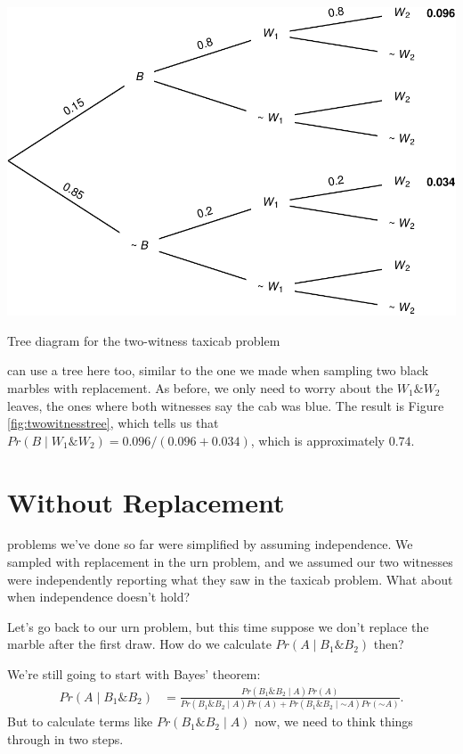 \documentclass[justified]{tufte-book}
\newcommand{\given}{\mid}
\renewcommand{\neg}{\mathbin{\sim}}
\renewcommand{\wedge}{\mathbin{\&}}
\newcommand{\p}{Pr}
\theoremstyle{definition}
\theoremstyle{definition}
\theoremstyle{definition}
\theoremstyle{remark}
\begin{document}
\begin{marginfigure}
\includegraphics{_main_files/figure-latex/twowitnesstree-1} \caption[Tree diagram for the two-witness taxicab problem]{Tree diagram for the two-witness taxicab problem}\label{fig:twowitnesstree}
\end{marginfigure}

 can use a tree here too, similar to the one we made when
sampling two black marbles with replacement. As before, we only need to
worry about the \(W_1 \wedge W_2\) leaves, the ones where both witnesses
say the cab was blue. The result is Figure \ref{fig:twowitnesstree},
which tells us that
\(\p(B \given W_1 \wedge W_2) = 0.096 / (0.096 + 0.034)\), which is
approximately \(0.74\).

\hypertarget{without-replacement}{%
\section{Without Replacement}\label{without-replacement}}

 problems we've done so far were simplified by assuming
independence. We sampled with replacement in the urn problem, and we
assumed our two witnesses were independently reporting what they saw in
the taxicab problem. What about when independence doesn't hold?

Let's go back to our urn problem, but this time suppose we don't replace
the marble after the first draw. How do we calculate
\(\p(A \given B_1 \wedge B_2)\) then?

We're still going to start with Bayes' theorem: \[
  \begin{aligned}
    \p(A \given B_1 \wedge B_2) &= \frac{\p(B_1 \wedge B_2 \given A)\p(A)}{\p(B_1 \wedge B_2 \given A) \p(A) + \p(B_1 \wedge B_2 \given \neg A) \p(\neg A)}.
  \end{aligned}
\] But to calculate terms like \(\p(B_1 \wedge B_2 \given A)\) now, we
need to think things through in two steps.
\end{document}
